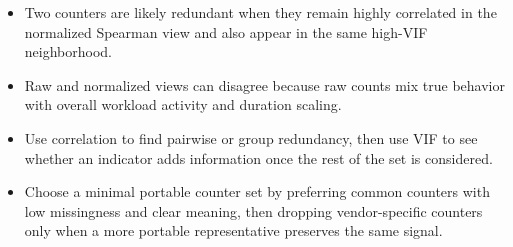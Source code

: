 \documentclass[
]{article}
\providecommand{\tightlist}{%
  \setlength{\itemsep}{0pt}\setlength{\parskip}{0pt}}
\begin{document}
\begin{itemize}
\tightlist
\item
  Two counters are likely redundant when they remain highly correlated
  in the normalized Spearman view and also appear in the same high-VIF
  neighborhood.
\item
  Raw and normalized views can disagree because raw counts mix true
  behavior with overall workload activity and duration scaling.
\item
  Use correlation to find pairwise or group redundancy, then use VIF to
  see whether an indicator adds information once the rest of the set is
  considered.
\item
  Choose a minimal portable counter set by preferring common counters
  with low missingness and clear meaning, then dropping vendor-specific
  counters only when a more portable representative preserves the same
  signal.
\end{itemize}
\end{document}
